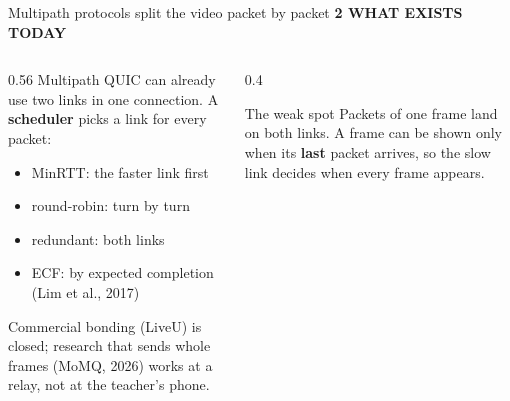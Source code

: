 \documentclass[aspectratio=169,11pt]{beamer}
\newcommand{\eyebrow}[1]{{\color{accent}\footnotesize\bfseries\MakeUppercase{#1}}\par\smallskip}
\begin{document}
\begin{frame}{Multipath protocols split the video packet by packet}
  \eyebrow{2 \textperiodcentered{} What exists today}
  \begin{columns}[T]
    \begin{column}{0.56\textwidth}
      Multipath QUIC can already use two links in one connection. A \textbf{scheduler} picks a link for every packet:
      \begin{itemize}
        \item MinRTT: the faster link first
        \item round-robin: turn by turn
        \item redundant: both links
        \item ECF: by expected completion (Lim et al., 2017)
      \end{itemize}
      \smallskip
      Commercial bonding (LiveU) is closed; research that sends whole frames (MoMQ, 2026) works at a relay, not at the teacher's phone.
    \end{column}
    \begin{column}{0.4\textwidth}
      \begin{alertblock}{The weak spot}
        Packets of one frame land on both links. A frame can be shown only when its \textbf{last} packet arrives, so the slow link decides when every frame appears.
      \end{alertblock}
    \end{column}
  \end{columns}
\end{frame}
\end{document}
